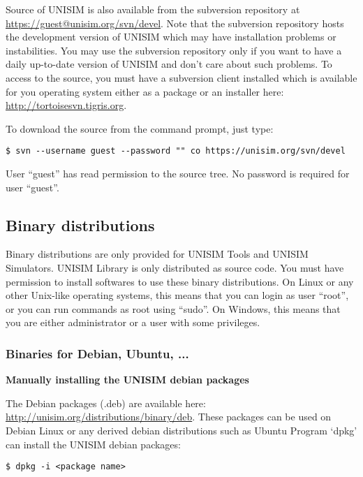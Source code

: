 Source of UNISIM is also available from the subversion repository at \url{https://guest@unisim.org/svn/devel}.
Note that the subversion repository hosts the development version of UNISIM which may have installation problems or instabilities.
You may use the subversion repository only if you want to have a daily up-to-date version of UNISIM and don’t care about such problems.
To access to the source, you must have a subversion client installed which is available for you operating system either as a package or an installer here: \url{http://tortoisesvn.tigris.org}.

To download the source from the command prompt, just type:

\begin{verbatim}
$ svn --username guest --password "" co https://unisim.org/svn/devel
\end{verbatim}

User “guest” has read permission to the source tree. No password is required for user “guest”.

\subsection{Binary distributions}

Binary distributions are only provided for UNISIM Tools and UNISIM Simulators. UNISIM Library is only distributed as source code.
You must have permission to install softwares to use these binary distributions.
On Linux or any other Unix-like operating systems, this means that you can login as user “root”, or you can run commands as root using “sudo”.
On Windows, this means that you are either administrator or a user with some privileges.

\subsubsection{Binaries for Debian, Ubuntu, ...}

\noindent \textbf{Manually installing the UNISIM debian packages}

The Debian packages (.deb) are available here: \url{http://unisim.org/distributions/binary/deb}.
These packages can be used on Debian Linux or any derived debian distributions such as Ubuntu
Program ‘dpkg’ can install the UNISIM debian packages:

\begin{verbatim}
$ dpkg -i <package name>
\end{verbatim}

